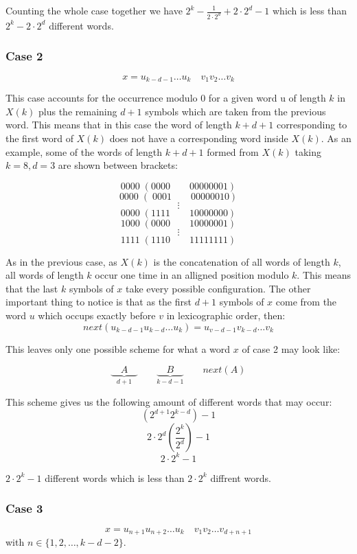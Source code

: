 \documentclass[11pt,a4paper,twoside]{tesis}
\theoremstyle{definition}
\begin{document}
Counting the whole case together we have $  2^k - \frac{1}{2\cdot2^{d} } + 2\cdot 2^d - 1$ which is less than $2^k -  2\cdot 2^d$ different words.

\subsubsection{Case 2}
$$ x = u_{k-d-1} \dots u_k \quad v_1 v_2 \dots v_k$$

This case accounts for the occurrence modulo 0 for a given word u of length $k$ in $X(k)$ plus the remaining $d + 1$ symbols which are taken from the previous word. This means that in this case the word of length $k + d + 1$ corresponding to the first word of $X(k)$ does not have a corresponding word inside $X(k)$.
As an example, some of the words of length $k + d + 1$ formed from $X(k)$ taking $k = 8, d = 3$ are shown between brackets:

$$0000 \; (0000 \qquad 00000001)$$
$$0000 \; ( \; 0001 \qquad 00000010)$$
$$\vdots$$
$$0000 \; (1111 \qquad 10000000)$$
$$1000 \; (0000 \qquad 10000001)$$
$$\vdots$$
$$1111 \; (1110 \qquad 11111111)$$

As in the previous case, as $X(k)$ is the concatenation of all words of length $k$, all words of length $k$ occur one time in an alligned position modulo $k$. This means that the last $k$ symbols of $x$ take every possible configuration.
The other important thing to notice is that as the first $d + 1$ symbols of $x$ come from the word $u$ which occups exactly before $v$ in lexicographic order, then: 
$$next(u_{k-d-1} u_{k-d} \dots u_k) = u_{v-d-1} v_{k-d} \dots v_k$$

This leaves only one possible scheme for what a word $x$ of case 2 may look like:

$$\underbrace{\quad A \quad }_{d +1} \qquad \underbrace{\quad B \quad }_{k - d - 1}  \qquad next(A)$$

This scheme gives us the following amount of different words that may occur:
$$(2^{d + 1} 2^{k-d})-1$$
$$ 2\cdot 2^d  (\frac{2^k}{2^d}) - 1$$
$$ 2 \cdot 2^k - 1$$

$ 2 \cdot 2^k - 1 $ different words which is less than $2 \cdot 2^k$ diffrent words.

\subsubsection{Case 3}
$$x = u_{n+1} u_{n+2} \dots u_k \quad  v_1 v_2 \dots v_{d+n+1} $$
with $n \in \{1,2,\dots ,k - d - 2\}$.
\\
\end{document}
